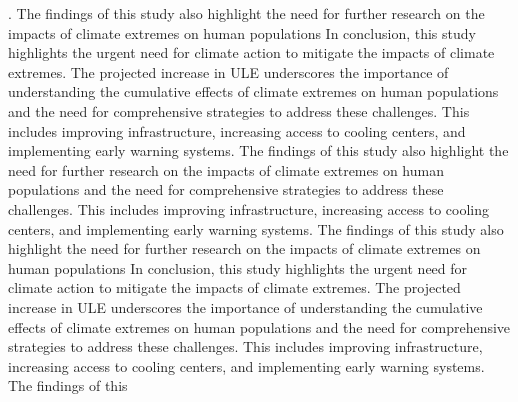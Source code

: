 \documentclass[9pt, twoside]{extarticle}
\begin{document}
\begin{maintext}
.\cite{IPCC2021} The findings of this study also highlight the need for further research on the impacts of climate extremes on human populations  In conclusion, this study highlights the urgent need for climate action to mitigate the impacts of climate extremes. The projected increase in ULE underscores the importance of understanding the cumulative effects of climate extremes on human populations and the need for comprehensive strategies to address these challenges. This includes improving infrastructure, increasing access to cooling centers, and implementing early warning systems.\cite{IPCC2021} The findings of this study also highlight the need for further research on the impacts of climate extremes on human populations and the need for comprehensive strategies to address these challenges. This includes improving infrastructure, increasing access to cooling centers, and implementing early warning systems.\cite{IPCC2021} The findings of this study also highlight the need for further research on the impacts of climate extremes on human populations  In conclusion, this study highlights the urgent need for climate action to mitigate the impacts of climate extremes. The projected increase in ULE underscores the importance of understanding the cumulative effects of climate extremes on human populations and the need for comprehensive strategies to address these challenges. This includes improving infrastructure, increasing access to cooling centers, and implementing early warning systems.\cite{IPCC2021} The findings of this 


\end{maintext}
\end{document}

